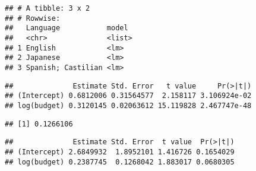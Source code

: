 \documentclass[
]{article}
\newenvironment{Shaded}{\begin{snugshade}}{\end{snugshade}}
\newcommand{\DecValTok}[1]{\textcolor[rgb]{0.00,0.00,0.81}{#1}}
\newcommand{\FunctionTok}[1]{\textcolor[rgb]{0.00,0.00,0.00}{#1}}
\newcommand{\NormalTok}[1]{#1}
\newcommand{\SpecialCharTok}[1]{\textcolor[rgb]{0.00,0.00,0.00}{#1}}
\begin{document}
\begin{verbatim}
## # A tibble: 3 x 2
## # Rowwise: 
##   Language           model 
##   <chr>              <list>
## 1 English            <lm>  
## 2 Japanese           <lm>  
## 3 Spanish; Castilian <lm>
\end{verbatim}

\begin{Shaded}
\end{Shaded}

\begin{verbatim}
##              Estimate Std. Error   t value     Pr(>|t|)
## (Intercept) 0.6812006 0.31564577  2.158117 3.106924e-02
## log(budget) 0.3120145 0.02063612 15.119828 2.467747e-48
\end{verbatim}

\begin{Shaded}
\end{Shaded}

\begin{verbatim}
## [1] 0.1266106
\end{verbatim}

\begin{Shaded}
\end{Shaded}

\begin{verbatim}
##              Estimate Std. Error  t value  Pr(>|t|)
## (Intercept) 2.6849932  1.8952101 1.416726 0.1654029
## log(budget) 0.2387745  0.1268042 1.883017 0.0680305
\end{verbatim}

\begin{Shaded}
\end{Shaded}
\end{document}
